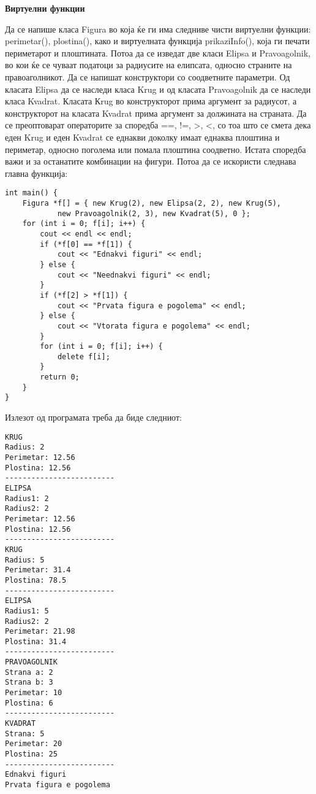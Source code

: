 \documentclass[12pt,a4paper]{exam}
\begin{document}
\pagestyle{headandfoot}
\headrule
{}
\begin{center}
\Large{\textbf{Виртуелни функции}}
\end{center}
\begin{questions}

\question
Да се напише класа Figura во која ќе ги има следниве чисти виртуелни функции:
perimetar(), plostina(), како и виртуелната функција prikaziInfo(), која ги печати периметарот
и плоштината. Потоа да се изведат две класи Elipsa и Pravoagolnik, во кои ќе се чуваат
податоци за радиусите на елипсата, односно страните на правоаголникот. Да се напишат
конструктори со соодветните параметри. Од класата Elipsa да се наследи класа Krug и од
класата Pravoagolnik да се наследи класа Kvadrat. Класата Кrug во конструкторот прима
аргумент за радиусот, а конструкторот на класата Kvadrat прима аргумент за должината
на страната. Да се преоптоварат операторите за споредба ==, !=, >, <, со тоа што се
смета дека еден Krug и еден Kvadrat се еднакви доколку имаат еднаква плоштина и
периметар, односно поголема или помала плоштина соодветно. Истата споредба важи и
за останатите комбинации на фигури. Потоа да се искористи следнава главна функција:
\begin{lstlisting}
int main() {
    Figura *f[] = { new Krug(2), new Elipsa(2, 2), new Krug(5),
            new Pravoagolnik(2, 3), new Kvadrat(5), 0 };
    for (int i = 0; f[i]; i++) {
        cout << endl << endl;
        if (*f[0] == *f[1]) {
            cout << "Ednakvi figuri" << endl;
        } else {
            cout << "Neednakvi figuri" << endl;
        }
        if (*f[2] > *f[1]) {
            cout << "Prvata figura e pogolema" << endl;
        } else {
            cout << "Vtorata figura e pogolema" << endl;
        }
        for (int i = 0; f[i]; i++) {
            delete f[i];
        }
        return 0;
    }
}
\end{lstlisting}
Излезот од програмата треба да биде следниот:
\begin{verbatim}
KRUG
Radius: 2
Perimetar: 12.56
Plostina: 12.56
-------------------------
ELIPSA
Radius1: 2
Radius2: 2
Perimetar: 12.56
Plostina: 12.56
-------------------------
KRUG
Radius: 5
Perimetar: 31.4
Plostina: 78.5
-------------------------
ELIPSA
Radius1: 5
Radius2: 2
Perimetar: 21.98
Plostina: 31.4
-------------------------
PRAVOAGOLNIK
Strana a: 2
Strana b: 3
Perimetar: 10
Plostina: 6
-------------------------
KVADRAT
Strana: 5
Perimetar: 20
Plostina: 25
-------------------------
Ednakvi figuri
Prvata figura e pogolema
\end{verbatim}


\end{questions}
\end{document}
